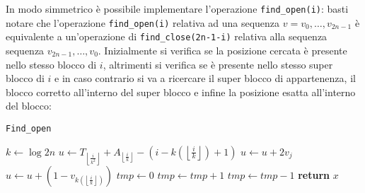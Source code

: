 \documentclass{article}
\begin{document}
In modo simmetrico è possibile implementare l'operazione \texttt{find\_open(i)}: basti notare che l'operazione \texttt{find\_open(i)} relativa ad una sequenza $v=v_0,\dots,v_{2n-1}$ è equivalente a un'operazione di \texttt{find\_close(2n-1-i)} relativa alla sequenza sequenza $v_{2n-1},\dots,v_0$. Inizialmente si verifica se la posizione cercata è presente nello stesso blocco di $i$, altrimenti si verifica se è presente nello stesso super blocco di $i$ e in caso contrario si va a ricercare il super blocco di appartenenza, il blocco corretto all'interno del super blocco e infine la posizione esatta all'interno del blocco:
    \begin{algorithm}[H]
    \caption{\texttt{Find\_open}}\label{findopen}
    \begin{algorithmic}[1]
        \State $k\gets\log{2n}$
        \State $u\gets T_{\left\lfloor{\frac{i}{k^2}}\right\rfloor}+A_{\left\lfloor{\frac{i}{k}}\right\rfloor}-(i-k(\left\lfloor{\frac{i}{k}}\right\rfloor)+1)$
            \State $u\gets u+2v_j$
        \EndFor
        \State $u\gets u+(1-v_{k(\left\lfloor{\frac{i}{k}}\right\rfloor)})$
        \State
        \State $tmp\gets 0$
                \State $tmp\gets tmp+1$
            \Else  
                \State $tmp\gets tmp-1$
            \EndIf
                \State \textbf{return} $x$
            \EndIf
        \EndFor
    \end{algorithmic}
    \end{algorithm}
\end{document}
